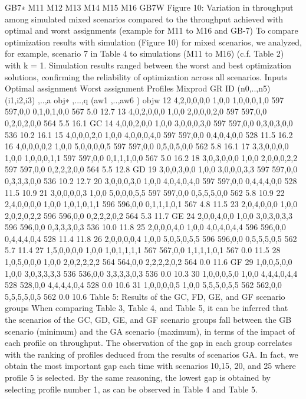 	GB7∗	M11	M12	M13	M14	M15	M16	GB7W
Figure 10: Variation in throughput among simulated mixed scenarios compared to the throughput achieved with optimal and worst assignments (example for M11 to M16 and GB-7)
To compare optimization results with simulation (Figure 10) for mixed scenarios, we analyzed, for example, scenario 7 in Table 4 to simulations (M11 to M16) (c.f. Table 2) with k = 1. Simulation results ranged between the worst and best optimization solutions, confirming the reliability of optimization across all scenarios.
		Inputs	Optimal assignment		Worst assignment	
		Profiles	Mixprod				
GR	ID	(n0,..,n5)	(i1,i2,i3)	 ,..,a 	obj∗	 ,...,q 	(aw1 ,..,aw6 )	objw	%
	12	4,2,0,0,0,0	1,0,0	1,0,0,0,1,0	597	597,0,0	0,1,0,1,0,0	567	5.0	12.7
	13	4,0,2,0,0,0	1,0,0	2,0,0,0,2,0	597	597,0,0	0,2,0,2,0,0	564	5.5	16.1
GC	14	4,0,0,2,0,0	1,0,0	3,0,0,0,3,0	597	597,0,0	0,3,0,3,0,0	536	10.2	16.1
	15	4,0,0,0,2,0	1,0,0	4,0,0,0,4,0	597	597,0,0	0,4,0,4,0,0	528	11.5	16.2
	16	4,0,0,0,0,2	1,0,0	5,0,0,0,0,5	597	597,0,0	0,5,0,5,0,0	562	5.8	16.1
	17	3,3,0,0,0,0	1,0,0	1,0,0,0,1,1	597	597,0,0	0,1,1,1,0,0	567	5.0	16.2
	18	3,0,3,0,0,0	1,0,0	2,0,0,0,2,2	597	597,0,0	0,2,2,2,0,0	564	5.5	12.8
GD	19	3,0,0,3,0,0	1,0,0	3,0,0,0,3,3	597	597,0,0	0,3,3,3,0,0	536	10.2	12.7
	20	3,0,0,0,3,0	1,0,0	4,0,4,0,4,0	597	597,0,0	0,4,4,4,0,0	528	11.5	10.9
	21	3,0,0,0,0,3	1,0,0	5,0,0,0,5,5	597	597,0,0	0,5,5,5,0,0	562	5.8	10.9
	22	2,4,0,0,0,0	1,0,0	1,0,1,0,1,1	596	596,0,0	0,1,1,1,0,1	567	4.8	11.5
	23	2,0,4,0,0,0	1,0,0	2,0,2,0,2,2	596	596,0,0	0,2,2,2,0,2	564	5.3	11.7
GE	24	2,0,0,4,0,0	1,0,0	3,0,3,0,3,3	596	596,0,0	0,3,3,3,0,3	536	10.0	11.8
	25	2,0,0,0,4,0	1,0,0	4,0,4,0,4,4	596	596,0,0	0,4,4,4,0,4	528	11.4	11.8
	26	2,0,0,0,0,4	1,0,0	5,0,5,0,5,5	596	596,0,0	0,5,5,5,0,5	562	5.7	11.4
	27	1,5,0,0,0,0	1,0,0	1,0,1,1,1,1	567	567,0,0	1,1,1,1,0,1	567	0.0	11.5
	28	1,0,5,0,0,0	1,0,0	2,0,2,2,2,2	564	564,0,0	2,2,2,2,0,2	564	0.0	11.6
GF	29	1,0,0,5,0,0	1,0,0	3,0,3,3,3,3	536	536,0,0	3,3,3,3,0,3	536	0.0	10.3
	30	1,0,0,0,5,0	1,0,0	4,4,4,0,4,4	528	528,0,0	4,4,4,4,0,4	528	0.0	10.6
	31	1,0,0,0,0,5	1,0,0	5,5,5,0,5,5	562	562,0,0	5,5,5,5,0,5	562	0.0	10.6
Table 5: Results of the GC, FD, GE, and GF scenario groups
When comparing Table 3, Table 4, and Table 5, it can be inferred that the scenarios of the GC, GD, GE, and GF scenario groups fall between the GB scenario (minimum) and the GA scenario (maximum), in terms of the impact of each profile on throughput. The observation of the gap in each group correlates with the ranking of profiles deduced from the results of scenarios GA. In fact, we obtain the most important gap each time with scenarios 10,15, 20, and 25 where profile 5 is selected. By the same reasoning, the lowest gap is obtained by selecting profile number 1, as can be observed in Table 4 and Table 5.
